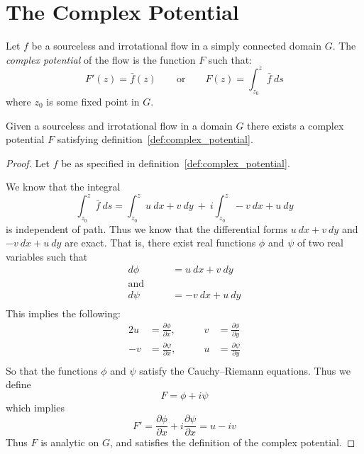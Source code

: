\documentclass[letterpaper, twoside, 12 pt]{article}
\begin{document}
\section{The Complex Potential} %
	\label{sec:complex_potential}

	\begin{definition}
	\label{def:complex_potential}
		Let $f$ be a sourceless and irrotational flow in a simply connected domain $G$.
		The \textit{complex potential} of the flow is the function $F$ such that:
		\[
			F'(z) = \bar f(z) \qquad \text{or} \qquad F(z) = \int_{z_0} ^z \bar f \ ds
		\]
		where $z_0$ is some fixed point in $G$.
	\end{definition}

	\begin{theorem}
		Given a sourceless and irrotational flow in a domain $G$ there exists a complex potential $F$ satisfying definition~\ref{def:complex_potential}.
	\end{theorem}
	\begin{proof}
		Let $f$ be as specified in definition~\ref{def:complex_potential}.

		We know that the integral
		\[
			\int_{z_0}^z \bar f \ ds = \int_{z_0}^z u\> dx + v\> dy \ + \ i \! \int_{z_0}^z -v \> dx + u \> dy
		\]
		is independent of path.
		Thus we know that the differential forms $u\> dx + v\> dy$ and $-v\> dx + u\> dy$ are exact.
		That is, there exist real functions $\phi$ and $\psi$ of two real variables such that 
		\begin{align*}
			d \phi &= u\> dx + v\> dy \\
			\text{and}\qquad &\\
			d \psi &= -v\> dx + u\> dy \\
		\end{align*}
		This implies the following:
		\begin{alignat*}{2}
			u &= \frac{\partial \phi}{\partial x},  \qquad	& v &= \frac{\partial \phi}{\partial y} \\[1 em]
			-v &= \frac{\partial \psi}{\partial x}, \qquad	& u &= \frac{\partial \psi}{\partial y} \\
		\end{alignat*}
		So that the functions $\phi$ and $\psi$ satisfy the Cauchy--Riemann equations.
		Thus we define 
		\[
			F = \phi + i \psi
		\]
		which implies
		\[
			F' = \frac{\partial \phi}{\partial x} + i \frac{\partial \psi}{\partial x} = u - iv 
		\]
		Thus $F$ is analytic on $G$, and satisfies the definition of the complex potential.
	\end{proof}
\end{document}
